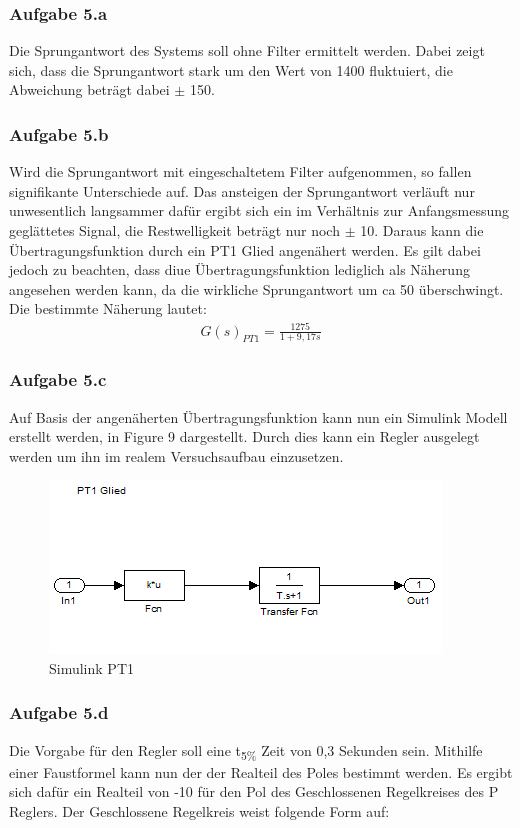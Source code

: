 \documentclass[10pt]{scrartcl}
\begin{document}
\subsubsection{Aufgabe 5.a}
Die Sprungantwort des Systems soll ohne Filter ermittelt werden. Dabei zeigt sich, dass die Sprungantwort stark um den Wert von 1400 fluktuiert, die Abweichung beträgt dabei $\pm$ 150.
\subsubsection{Aufgabe 5.b}
Wird die Sprungantwort mit eingeschaltetem Filter aufgenommen, so fallen signifikante Unterschiede auf. Das ansteigen der Sprungantwort verläuft nur unwesentlich langsammer dafür ergibt sich ein im Verhältnis zur Anfangsmessung geglättetes Signal, die Restwelligkeit  beträgt nur noch $\pm$ 10. Daraus kann die Übertragungsfunktion durch ein PT1 Glied angenähert werden. Es gilt dabei jedoch zu beachten, dass diue Übertragungsfunktion lediglich als Näherung angesehen werden kann, da die wirkliche Sprungantwort um ca 50 überschwingt. Die bestimmte Näherung lautet: 
\begin{align}
   G(s)_{PT1}=\frac{1275}{1+9,17s}
\end{align}
\subsubsection{Aufgabe 5.c}
Auf Basis der angenäherten Übertragungsfunktion kann nun ein Simulink Modell erstellt werden, in Figure 9 dargestellt. Durch dies kann ein Regler ausgelegt werden um ihn im realem Versuchsaufbau einzusetzen.\\

\begin{figure}
  \includegraphics[scale=0.51]{Leon-PRT-Bilder/Drehzahl5cklein}
  \caption{Simulink PT1}
\end{figure}
\subsubsection{Aufgabe 5.d}
Die Vorgabe für den Regler soll eine t\textsubscript{5\%} Zeit von 0,3 Sekunden sein. Mithilfe einer Faustformel kann nun der der Realteil des Poles bestimmt werden. Es ergibt sich dafür ein Realteil von -10 für den Pol des Geschlossenen Regelkreises des P Reglers. Der Geschlossene Regelkreis weist folgende Form auf: 	
\end{document}
